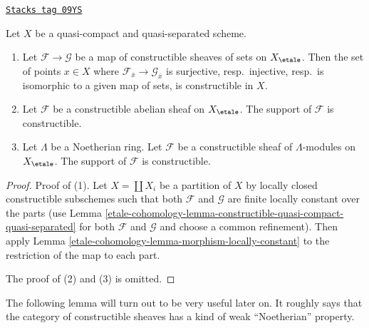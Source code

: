 \begin{lemma}
\label{etale-cohomology-lemma-support-constructible}
\href{https://stacks.math.columbia.edu/tag/09YS}{\texttt{Stacks tag 09YS}}

Let $X$ be a quasi-compact and quasi-separated scheme.
\begin{enumerate}
\item Let $\mathcal{F} \to \mathcal{G}$ be a map of constructible
sheaves of sets on $X_\etale$. Then the set of points $x \in X$
where $\mathcal{F}_{\overline{x}} \to \mathcal{G}_{\overline{x}}$
is surjective, resp.\ injective, resp.\ is isomorphic to a given map
of sets, is constructible in $X$.
\item Let $\mathcal{F}$ be a constructible abelian sheaf on $X_\etale$.
The support of $\mathcal{F}$ is constructible.
\item Let $\Lambda$ be a Noetherian ring.
Let $\mathcal{F}$ be a constructible sheaf of $\Lambda$-modules on $X_\etale$.
The support of $\mathcal{F}$ is constructible.
\end{enumerate}
\end{lemma}

\begin{proof}
Proof of (1).
Let $X = \coprod X_i$ be a partition of $X$ by locally closed constructible
subschemes such that both $\mathcal{F}$ and $\mathcal{G}$ are
finite locally constant over the parts (use
Lemma \ref{etale-cohomology-lemma-constructible-quasi-compact-quasi-separated}
for both $\mathcal{F}$ and $\mathcal{G}$ and choose a common
refinement). Then apply Lemma \ref{etale-cohomology-lemma-morphism-locally-constant}
to the restriction of the map to each part.

\medskip\noindent
The proof of (2) and (3) is omitted.
\end{proof}

The following lemma will turn out to be very useful later on.
It roughly says that the category of constructible sheaves
has a kind of weak ``Noetherian'' property.


